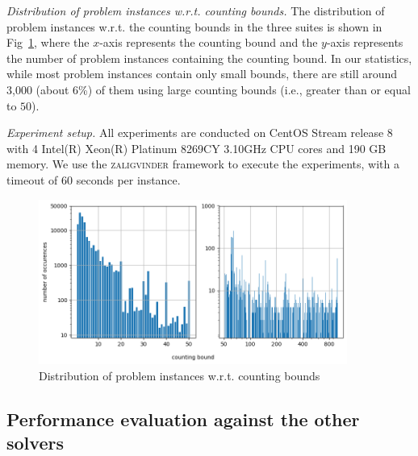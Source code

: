 \medskip
\noindent
\emph{Distribution of problem instances w.r.t. counting bounds. }
The distribution of problem instances w.r.t. the counting bounds in the three suites is shown in Fig~\ref{fig:count_distri}, where the $x$-axis represents the counting bound and the $y$-axis represents the number of problem instances containing the counting bound. 
In our statistics, while most problem instances contain only small bounds, there are still around 3,000  (about 6\%) of them using large counting bounds (i.e., greater than or equal to $50$).

\medskip
\noindent
\emph{Experiment setup.}
All experiments are conducted on CentOS Stream release 8 with 4 Intel(R) Xeon(R) Platinum 8269CY 3.10GHz CPU cores and 190 GB memory. We use the \textsc{zaligvinder} framework \cite{zaligvinder_2021} to execute the experiments, with a timeout of 60 seconds per instance.


%
\begin{figure}
  \centering\vskip 0pt
  \includegraphics[width=0.9\textwidth]{counting_distribution.png}  
  \caption{Distribution of problem instances w.r.t. counting bounds}  
  \label{fig:count_distri}
\end{figure}

\subsection{Performance evaluation against the other solvers}\label{subsec:overall_eval}

